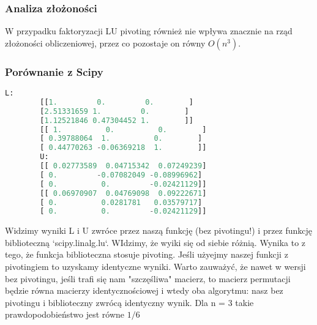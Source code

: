 \documentclass[12pt,a4paper,table]{article}
\begin{document}
    \subsubsection{Analiza złożoności}
    W przypadku faktoryzacji LU pivoting również nie wpływa znacznie na rząd złożoności obliczeniowej, przez co pozostaje on równy \( O(n^3) \).
    \subsubsection{Porównanie z Scipy}

    \begin{lstlisting}[language=Python]
        L:
        [[1.         0.         0.        ]
        [2.51331659 1.         0.        ]
        [1.12521846 0.47304452 1.        ]]
        [[ 1.          0.          0.        ]
        [ 0.39788064  1.          0.        ]
        [ 0.44770263 -0.06369218  1.        ]]
        U:
        [[ 0.02773589  0.04715342  0.07249239]
        [ 0.         -0.07082049 -0.08996962]
        [ 0.          0.         -0.02421129]]
        [[ 0.06970907  0.04769098  0.09222671]
        [ 0.          0.0281781   0.03579717]
        [ 0.          0.         -0.02421129]]

    \end{lstlisting}
    
    Widzimy wyniki L i U zwróce przez naszą funkcję (bez pivotingu!) i przez funkcję
    biblioteczną `scipy.linalg.lu`. WIdzimy, że wyiki się od siebie różnią. Wynika to z tego, że
    funkcja biblioteczna stosuje pivoting. Jeśli użyejmy naszej funkcji z pivotingiem to uzyskamy
    identyczne wyniki. Warto zauważyć, że nawet w wersji bez pivotingu, jeśli trafi się nam
    "szczęśliwa" macierz, to macierz permutacji będzie równa macierzy identycznościowej
    i wtedy oba algorytmu: nasz bez pivotingu i biblioteczny zwrócą identyczny wynik.
    Dla n = 3 takie prawdopodobieństwo jest równe $1/6$


    
\end{document}
